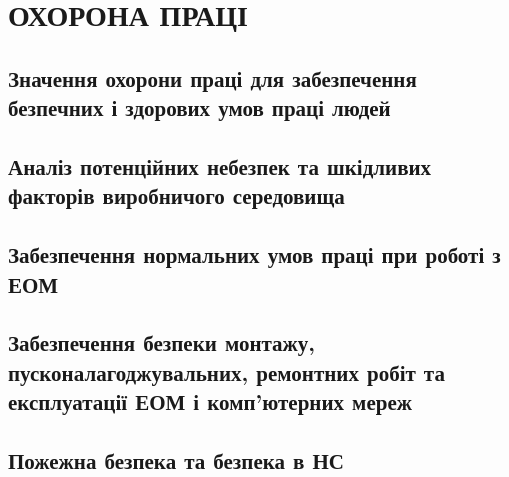 \section{ОХОРОНА ПРАЦІ}
\subsection{Значення охорони праці для забезпечення безпечних і здорових умов праці людей}
\newpage
\thispagestyle{empty}
\mbox{}

\subsection{Аналіз потенційних небезпек та шкідливих факторів виробничого середовища}
\newpage
\thispagestyle{empty}
\mbox{}
\newpage
\thispagestyle{empty}
\mbox{}

\subsection{Забезпечення нормальних умов праці при роботі з ЕОМ}
\newpage
\thispagestyle{empty}
\mbox{}
\newpage
\thispagestyle{empty}
\mbox{}
\newpage
\thispagestyle{empty}
\mbox{}
\newpage
\thispagestyle{empty}
\mbox{}
\newpage
\thispagestyle{empty}
\mbox{}
\newpage
\thispagestyle{empty}
\mbox{}

\subsection{Забезпечення безпеки монтажу, пусконалагоджувальних, ремонтних робіт та експлуатації ЕОМ і комп’ютерних мереж}
\newpage
\thispagestyle{empty}
\mbox{}
\newpage
\thispagestyle{empty}
\mbox{}
\subsection{Пожежна безпека та безпека в НС}
\newpage
\thispagestyle{empty}
\mbox{}
\newpage
\thispagestyle{empty}
\mbox{}
\newpage
\thispagestyle{empty}
\mbox{}
